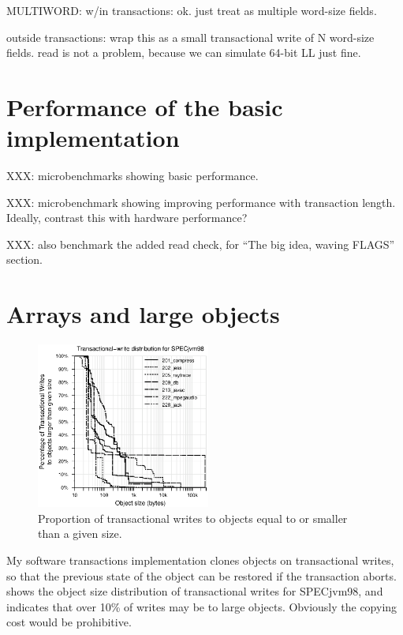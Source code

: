 MULTIWORD:
w/in transactions: ok.  just treat as multiple word-size fields.

outside transactions:
wrap this as a small transactional write of N word-size fields.
read is not a problem, because we can simulate 64-bit LL just fine.





\section{Performance of the basic implementation}

XXX: microbenchmarks showing basic performance.

XXX: microbenchmark showing improving performance with transaction
length.  Ideally, contrast this with hardware performance?

XXX: also benchmark the added read check, for ``The big idea, waving
FLAGS'' section.


\section{Arrays and large objects}\label{sec:largeobj}
\begin{figure}
\begin{center}
\includegraphics[width=2.25in,clip=true]{Figures/tr-w-all.eps}%
\end{center}%
\caption{Proportion of transactional writes to objects equal to or
  smaller than a given size.}
\label{fig:tr-w}%
\end{figure}%
My software transactions implementation clones objects on
transactional writes, so that the previous state of the object can be
restored if the transaction aborts.   shows the object
size distribution of transactional writes for SPECjvm98, and
indicates that over 10\% of writes may be to large objects.
Obviously the copying cost would be prohibitive.

